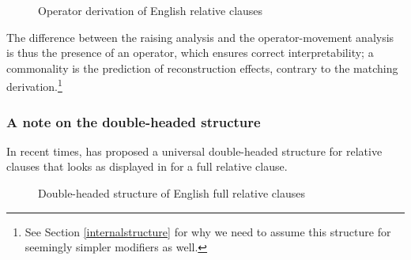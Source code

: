 \begin{figure}
\caption{Operator derivation of English relative clauses}
\label{Operator derivation English}
\end{figure}

The difference between the raising analysis and the operator-movement analysis is thus the presence of an operator, which ensures correct interpretability; a commonality is the prediction of reconstruction effects, contrary to the matching derivation.\footnote{See Section \ref{internalstructure} for why we need to assume this structure for seemingly simpler modifiers as well.}

\subsubsection{A note on the double-headed structure}

In recent times, \citet{cinque:2020:relcl} has proposed a universal double-headed structure for relative clauses that looks as displayed in  for a full relative clause.

\begin{figure}
\centering
{}
\caption{Double-headed structure of English full relative clauses}
\label{Double-headed structure English}
\end{figure}

